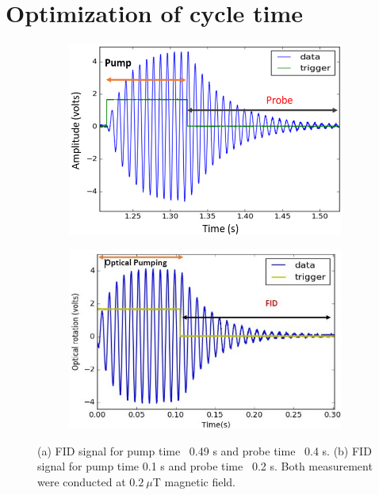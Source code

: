    \section{Optimization of cycle time} 
   \begin{figure}
    \centering
 
    \begin{subfigure}[b]{0.425\textwidth}
        \centering
        \includegraphics[width=\textwidth]{figures/Capture}
        \caption{}
        \label{fig:pump short}
    \end{subfigure}
    \hfill
    \begin{subfigure}[b]{0.42\textwidth}
        \centering
        \includegraphics[width=\textwidth]{figures/Capture2}
        \caption{}
        \label{fig:pump long}
    \end{subfigure}
    \caption{(a) FID signal for pump time~ 0.49 s and probe time~ 0.4 s. (b) FID signal for pump time  0.1 s and probe time ~0.2 s. Both measurement were conducted at $0.2~\mu$T magnetic field.}
    \label{fig:pump time}
\end{figure} 
